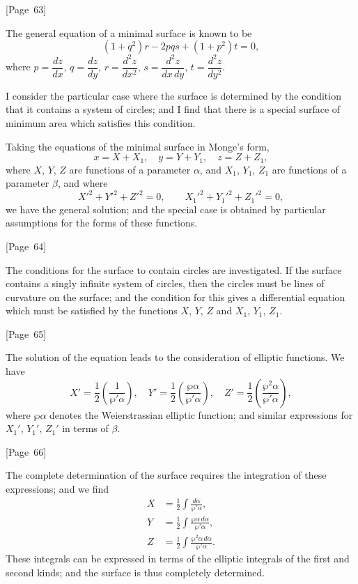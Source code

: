 \documentclass[11pt,a4paper]{book}
\begin{document}
\begin{center}
[Page~63]
\end{center}

The general equation of a minimal surface is known to be
\[
(1 + q^2)r - 2pqs + (1 + p^2)t = 0,
\]
where $p = \dfrac{dz}{dx}$, $q = \dfrac{dz}{dy}$, $r = \dfrac{d^2z}{dx^2}$,
$s = \dfrac{d^2z}{dx\,dy}$, $t = \dfrac{d^2z}{dy^2}$.

I consider the particular case where the surface is determined by the
condition that it contains a system of circles; and I find that there
is a special surface of minimum area which satisfies this condition.

Taking the equations of the minimal surface in Monge's form,
\[
x = X + X_1, \quad y = Y + Y_1, \quad z = Z + Z_1,
\]
where $X$, $Y$, $Z$ are functions of a parameter $\alpha$, and $X_1$,
$Y_1$, $Z_1$ are functions of a parameter $\beta$, and where
\[
X'^2 + Y'^2 + Z'^2 = 0, \qquad X_1'^2 + Y_1'^2 + Z_1'^2 = 0,
\]
we have the general solution; and the special case is obtained by
particular assumptions for the forms of these functions.

\begin{center}
[Page~64]
\end{center}

The conditions for the surface to contain circles are investigated.
If the surface contains a singly infinite system of circles, then the
circles must be lines of curvature on the surface; and the condition
for this gives a differential equation which must be satisfied by the
functions $X$, $Y$, $Z$ and $X_1$, $Y_1$, $Z_1$.

\begin{center}
[Page~65]
\end{center}

The solution of the equation leads to the consideration of elliptic
functions. We have
\[
X' = \frac{1}{2}\left(\frac{1}{\wp'\alpha}\right), \quad
Y' = \frac{1}{2}\left(\frac{\wp\alpha}{\wp'\alpha}\right), \quad
Z' = \frac{1}{2}\left(\frac{\wp^2\alpha}{\wp'\alpha}\right),
\]
where $\wp\alpha$ denotes the Weierstrassian elliptic function; and
similar expressions for $X_1'$, $Y_1'$, $Z_1'$ in terms of $\beta$.

\begin{center}
[Page~66]
\end{center}

The complete determination of the surface requires the integration of
these expressions; and we find
\begin{align*}
X &= \frac{1}{2}\int \frac{d\alpha}{\wp'\alpha}, \\
Y &= \frac{1}{2}\int \frac{\wp\alpha\,d\alpha}{\wp'\alpha}, \\
Z &= \frac{1}{2}\int \frac{\wp^2\alpha\,d\alpha}{\wp'\alpha}.
\end{align*}
These integrals can be expressed in terms of the elliptic integrals of
the first and second kinds; and the surface is thus completely
determined.
\end{document}
